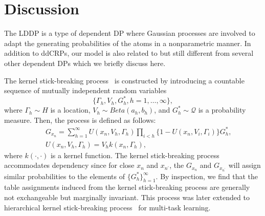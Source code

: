 \documentclass[runningheads,a4paper]{iscide}
\begin{document}





\section{Discussion}
The LDDP is a type of dependent DP where Gaussian
processes are involved to adapt the generating probabilities of the
atoms in a nonparametric manner. In addition to ddCRPs, our model is also
related to but still different from several other dependent DPs which
we briefly discuss here.

The kernel stick-breaking process~\cite{Dunson08KSBP} is constructed by introducing a countable sequence of mutually independent random
variables
\begin{equation}
\{\Gamma_h, V_h, G_h^*, h=1, \ldots, \infty\} ,
\end{equation}
where $\Gamma_h\sim H$ is a location, $V_h\sim Beta(a_h, b_h)$, and
$G_h^*\sim \mathcal{Q}$ is a probability measure. Then, the process
is defined as follows:
\begin{eqnarray}
&&G_{x_n}=\sum_{h=1}^\infty U(x_n, V_h,
\Gamma_h)\prod_{i<h}\{1-U(x_n,
V_i, \Gamma_i)\}G_h^*, \nonumber\\ &&U(x_n, V_h, \Gamma_h)
= V_h k(x_n, \Gamma_h),
\end{eqnarray} where
$k(\cdot,\cdot)$ is a kernel
function. The kernel stick-breaking process accommodates dependency
since for close $x_n$ and $x_{n^\prime}$, the $G_{x_n}$ and
$G_{x_{n^\prime}}$ will assign similar probabilities to the elements
of $\{G_h^*\}_{h=1}^\infty$. By inspection, we find that the table
assignments induced from the kernel stick-breaking process are
generally not exchangeable but marginally invariant. This process was later
extended to hierarchical kernel stick-breaking
process~\cite{An08HKSBP} for multi-task learning.
\end{document}

